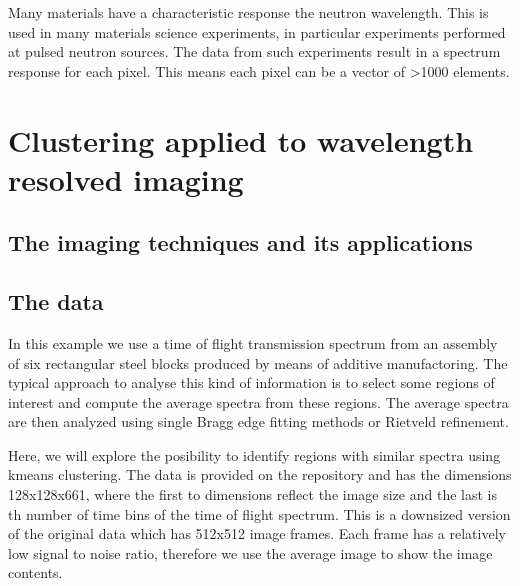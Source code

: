 \documentclass[letterpaper,10pt,english]{sphinxmanual}
\begin{document}
Many materials have a characteristic response the neutron wavelength. This is used in many materials science experiments, in particular experiments performed at pulsed neutron sources. The data from such experiments result in a spectrum response for each pixel. This means each pixel can be a vector of \textgreater{}1000 elements.


\section{Clustering applied to wavelength resolved imaging}
\label{\detokenize{ML4NeutronImageSegmentation:clustering-applied-to-wavelength-resolved-imaging}}

\subsection{The imaging techniques and its applications}
\label{\detokenize{ML4NeutronImageSegmentation:the-imaging-techniques-and-its-applications}}

\subsection{The data}
\label{\detokenize{ML4NeutronImageSegmentation:the-data}}
In this example we use a time of flight transmission spectrum from an assembly of six rectangular steel blocks produced by means of additive manufactoring. The typical approach to analyse this kind of information is to select some regions of interest and compute the average spectra from these regions. The average spectra are then analyzed using single Bragg edge fitting methods or Rietveld refinement.

Here, we will explore the posibility to identify regions with similar spectra using k\sphinxhyphen{}means clustering. The data is provided on the repository and has the dimensions 128x128x661, where the first to dimensions reflect the image size and the last is th number of time bins of the time of flight spectrum. This is a downsized version of the original data which has 512x512 image frames. Each frame has a relatively low signal to noise ratio, therefore we use the average image  to show the image contents.

\begin{sphinxVerbatim}[commandchars=\\\{\}]
   
  
\end{sphinxVerbatim}
\end{document}

